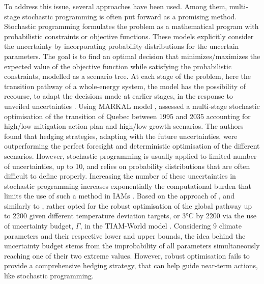 To address this issue, several approaches have been used. Among them,  multi-stage stochastic programming is often put forward as a promising method. Stochastic programming formulates the problem as a mathematical program with probabilistic constraints or objective functions. These models explicitly consider the uncertainty by incorporating probability distributions for the uncertain parameters. The goal is to find an optimal decision that minimizes/maximizes the expected value of the objective function while satisfying the probabilistic constraints, modelled as a scenario tree.  At each stage of the problem, here the transition pathway of a whole-energy system, the model has the possibility of recourse, \ie to adapt the decisions made at earlier stages, in the response to unveiled uncertainties \cite{grossmann2016recent}. Using MARKAL model \cite{fishbone1981markal}, \citet{kanudia1998robust} assessed a multi-stage stochastic optimisation of the transition of Quebec between 1995 and 2035 accounting for high/low mitigation action plan and high/low growth scenarios. The authors found that hedging strategies, adapting with the future uncertainties, were outperforming the perfect foresight and deterministic optimisation of the different scenarios. However, stochastic programming is usually applied to limited number of uncertainties, \ie up to 10, and relies on probability distributions that are often difficult to define properly. Increasing the number of these uncertainties in stochastic programming increases exponentially the computational burden that limits the use of such a method in \gls{IAMs} \cite{nicolas2021robust}. Based on the approach of \citet{bertsimas2004price}, and similarly to \citet{Moret2017PhDThesis}, \citet{nicolas2021robust} rather opted for the robust optimisation of the global pathway up to 2200 given different temperature deviation targets,  or 3°C by 2200 via the use of uncertainty budget, $\Gamma$, in the TIAM-World model \cite{loulou2005documentation}. Considering 9 climate parameters and their respective lower and upper bounds, the idea behind the uncertainty budget stems from the improbability of all parameters simultaneously reaching one of their two extreme values.  However, robust optimisation fails to provide a comprehensive hedging strategy, that can help guide near-term actions, like stochastic programming.

